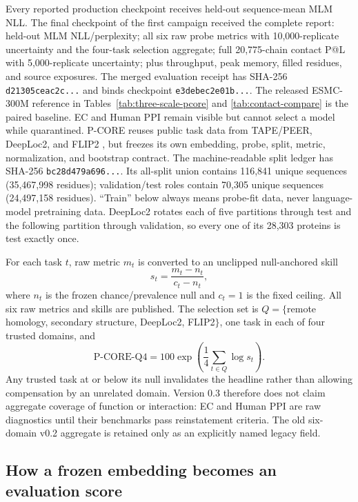 \documentclass{article}
\newcommand{\code}[1]{\texttt{#1}}
\begin{document}
Every reported production checkpoint receives held-out sequence-mean MLM NLL.
The final checkpoint of the first campaign
received the complete report: held-out MLM NLL/perplexity; all six raw probe
metrics with 10,000-replicate uncertainty and the four-task selection aggregate;
full 20,775-chain contact P@L with 5,000-replicate uncertainty; plus throughput,
peak memory, filled residues, and source exposures. The merged evaluation
receipt has SHA-256 \code{d21305ceac2c...} and binds checkpoint
\code{e3debec2e01b...}. The released
ESMC-300M reference in Tables~\ref{tab:three-scale-pcore} and
\ref{tab:contact-compare} is the paired baseline. EC and Human PPI remain
visible but cannot select a model while quarantined. P-CORE reuses public task data from
TAPE/PEER, DeepLoc2, and FLIP2
\citep{rao2019tape,xu2022peer,thumuluri2022deeploc2,didi2026flip2}, but freezes
its own embedding, probe, split, metric, normalization, and bootstrap contract.
The machine-readable split ledger has SHA-256
\code{bc28d479a696...}. Its all-split union contains 116,841 unique sequences
(35,467,998 residues); validation/test roles contain 70,305 unique sequences
(24,497,158 residues). ``Train'' below always means probe-fit data, never
language-model pretraining data. DeepLoc2 rotates each of five partitions
through test and the following partition through validation, so every one of
its 28,303 proteins is test exactly once.

For each task $t$, raw metric $m_t$ is converted to an unclipped null-anchored
skill
\[
  s_t = \frac{m_t-n_t}{c_t-n_t},
\]
where $n_t$ is the frozen chance/prevalence null and $c_t=1$ is the fixed
ceiling. All six raw metrics and skills are published. The selection set is
$Q=\{$remote homology, secondary structure, DeepLoc2, FLIP2$\}$, one task in
each of four trusted domains, and
\[
  \mathrm{P\mbox{-}CORE\mbox{-}Q4}
  =100\exp\!\left(\frac{1}{4}\sum_{t\in Q}\log s_t\right).
\]
Any trusted task at or below its null invalidates the headline rather than
allowing compensation by an unrelated domain. Version 0.3 therefore does not
claim aggregate coverage of function or interaction: EC and Human PPI are raw
diagnostics until their benchmarks pass reinstatement criteria. The old
six-domain v0.2 aggregate is retained only as an explicitly named legacy field.

\subsection{How a frozen embedding becomes an evaluation score}
\end{document}
